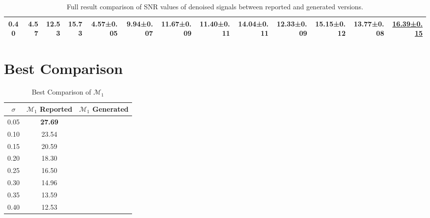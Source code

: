 \documentclass[a4paper, 12pt]{article}
\begin{document}
\begin{table}[H]
{\begin{tabular}{@{}crrrrrrrrrrrr@{}}
			0.40        & 4.57                                       & 12.53                                                                    & 15.73                                 & 4.57±0.05                     & 9.94±0.07                             & 11.67±0.09                            & 11.40±0.11                            & 14.04±0.11                            & 12.33±0.09                            & 15.15±0.12                            & 13.77±0.08                            & \underline{\textbf{16.39±0.15}}       \\
			\bottomrule
		\end{tabular}
	}
	\caption{Full result comparison of SNR values of denoised signals between reported and generated versions.}\label{tab:comparison}
\end{table}

\section{Best Comparison}

\begin{table}[H]
	\centering{}
	\begin{tabular}{ccc}\toprule
		\(\sigma \) & \(\mathcal{M}_1\) Reported & \(\mathcal{M}_1\) Generated \\ \midrule
		0.05        & \textbf{27.69}             &                             \\
		0.10        & 23.54                      &                             \\
		0.15        & 20.59                      &                             \\
		0.20        & 18.30                      &                             \\
		0.25        & 16.50                      &                             \\
		0.30        & 14.96                      &                             \\
		0.35        & 13.59                      &                             \\
		0.40        & 12.53                      &                             \\
		\bottomrule
	\end{tabular}
	\caption{Best Comparison of \(\mathcal{M}_1\)}\label{tab:best}
\end{table}


{
\footnotesize
\printbibliography{}
}
\end{document}
